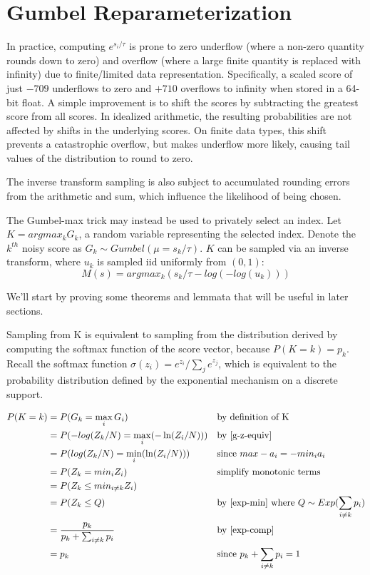 \documentclass{article}
\begin{document}
\section{Gumbel Reparameterization} 
\label{gumbel-reparam} 
 
In practice, computing $e^{s_i / \tau}$ is prone to 
zero underflow (where a non-zero quantity rounds down to zero) 
and overflow (where a large finite quantity is replaced with infinity) 
due to finite/limited data representation.  
Specifically, a scaled score of just $-709$ underflows to zero and $+710$ overflows to infinity when stored in a 64-bit float.  
A simple improvement is to shift the scores by subtracting the greatest score from all scores. 
In idealized arithmetic, the resulting probabilities are not affected by shifts in the underlying scores. 
On finite data types, this shift prevents a catastrophic overflow, but makes underflow more likely,  
causing tail values of the distribution to round to zero.  
 
The inverse transform sampling is also subject to accumulated rounding errors from the arithmetic and sum,  
which influence the likelihood of being chosen. 
 
The Gumbel-max trick may instead be used to privately select an index. 
Let $K = argmax_k G_k$, a random variable representing the selected index.  
Denote the $k^{th}$ noisy score as $G_k \sim Gumbel(\mu = s_k / \tau)$. 
$K$ can be sampled via an inverse transform, where $u_k$ is sampled iid uniformly from $(0, 1)$: 
\begin{equation} 
    M(s) = argmax_k (s_k / \tau - log(-log(u_k))) 
\end{equation} 
 
We'll start by proving some theorems and lemmata that will be useful in later sections.
\begin{theorem} 
    \label{gumbel-equiv} 
Sampling from K is equivalent to sampling from the distribution derived by computing the softmax function of the score vector, because $P(K=k) = p_k$. \cite{Medina2020DuffAD} 
Recall the softmax function $\sigma(z_i) = e^{z_i} / \sum_j e^{z_j}$,
which is equivalent to the probability distribution defined by the exponential mechanism on a discrete support.
\end{theorem} 
\begin{align*} 
    P(K = k) &= P(G_k = \max_i G_i) &&\text{by definition of K} \\ 
    &= P(-log(Z_k / N) = \max_i(-\ln(Z_i / N))) &&\text{by \ref{g-z-equiv}}\\ 
    &= P(log(Z_k / N) = \min_i(\ln(Z_i / N))) &&\text{since } max -a_i = -min_i a_i \\ 
    &= P(Z_k = min_i Z_i) &&\text{simplify monotonic terms} \\ 
    &= P(Z_k \leq min_{i \neq k} Z_i) \\ 
    &= P(Z_k \leq Q) &&\text{by \ref{exp-min} where } Q \sim Exp(\sum_{i \neq k} p_i)\\ 
    &= \frac{p_k}{p_k + \sum_{i \neq k} p_i}  &&\text{by \ref{exp-comp}} \\ 
    &= p_k &&\text{since } p_k + \sum_{i \neq k} p_i = 1 
\end{align*} 
 
\end{document}
